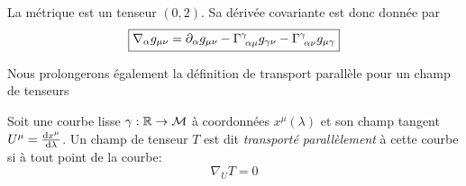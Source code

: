 \begin{exmp}
    La métrique est un tenseur $(0,2)$. Sa dérivée covariante est donc donnée par
    \begin{equation}
        \boxed{\nabla_{\alpha} g_{\mu \nu} = \partial_{\alpha}g_{\mu \nu} - \Gamma\indices{^{\gamma}_{\!\alpha \mu}}g_{\gamma \nu}-\Gamma\indices{^{\gamma}_{\!\alpha \nu}}g_{\mu \gamma}}
    \end{equation}
\end{exmp}
Nous prolongerons également la définition de transport parallèle pour un champ de tenseurs
\begin{theoremframe}
    \begin{defi}
    
        Soit une courbe lisse $\gamma:\mathbb{R} \to \mathcal{M}$ à coordonnées $x^{\mu}(\lambda)$ et son champ tangent $U^{\mu} = \frac{\mathrm{d} x^{\mu}}{\mathrm{d}\lambda}$. Un champ de tenseur $T$ est dit \emph{transporté parallèlement} à cette courbe si à tout point de la courbe:
        \begin{equation}
            \nabla_U T = 0
        \end{equation}
    \end{defi}
\end{theoremframe}
